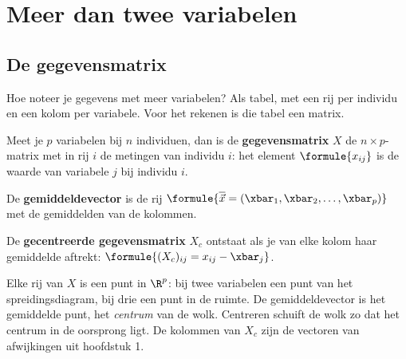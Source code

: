 \begin{oefeningen}[Start]

\end{oefeningen}


\section{Meer dan twee variabelen}

\subsection{De gegevensmatrix}

Hoe noteer je gegevens met meer variabelen? Als tabel, met een rij per individu en een kolom per variabele. Voor het rekenen is die tabel een matrix.

\begin{theorie}
Meet je $p$ variabelen bij $n$ individuen, dan is de \textbf{\textcolor{accent}{gegevensmatrix}} $X$ de $n \times p$-matrix met in rij $i$ de metingen van individu $i$: het element $\formule{x_{ij}}$ is de waarde van variabele $j$ bij individu $i$.

De \textbf{\textcolor{accent}{gemiddeldevector}} is de rij $\formule{\overline{\vec x} = (\xbar_1, \xbar_2, \ldots, \xbar_p)}$ met de gemiddelden van de kolommen.

De \textbf{\textcolor{accent}{gecentreerde gegevensmatrix}} $X_c$ ontstaat als je van elke kolom haar gemiddelde aftrekt: $\formule{(X_c)_{ij} = x_{ij} - \xbar_j}$.
\end{theorie}

Elke rij van $X$ is een punt in $\R^p$: bij twee variabelen een punt van het spreidingsdiagram, bij drie een punt in de ruimte. De gemiddeldevector is het gemiddelde punt, het \textit{centrum} van de wolk. Centreren schuift de wolk zo dat het centrum in de oorsprong ligt. De kolommen van $X_c$ zijn de vectoren van afwijkingen uit hoofdstuk 1.

